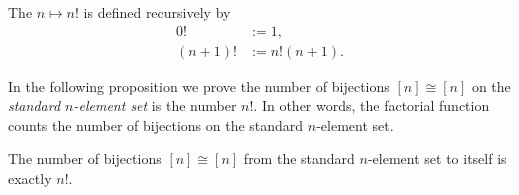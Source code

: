 \begin{definition}
  The  $n\mapsto n!$ is defined recursively by
  \begin{align*}
    0! & := 1, \\
    (n+1)! & := n!(n+1).
  \end{align*}  
\end{definition}

In the following proposition we prove the number of bijections $[n]\cong[n]$ on the \emph{standard $n$-element set} is the number $n!$. In other words, the factorial function counts the number of bijections on the standard $n$-element set.
  
\begin{proposition}
  The number of bijections $[n]\cong [n]$ from the standard $n$-element set to itself is exactly $n!$.
\end{proposition}

